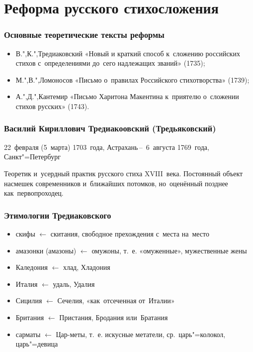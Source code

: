 \documentclass{beamer}
\begin{document}
\section{Реформа русского стихосложения}\label{sec:sys}


\begin{frame}
\frametitle{Основные теоретические тексты реформы}

\begin{itemize}
\item В.",К.",Тредиаковский «Новый и краткий способ к~сложению российских стихов с~определениями до~сего надлежащих званий» (1735);
\item М.",В.",Ломоносов  «Письмо о~правилах Российского стихотворства» (1739);
\item А.",Д.",Кантемир «Письмо Харитона Макентина к~приятелю о~сложении стихов русских» (1743).
\end{itemize}

\end{frame}


\begin{frame}
\frametitle{Василий Кириллович Тредиакоовский (Тредьяковский) }
\begin{flushleft}
22~февраля (5~марта) 1703~года, Астрахань\,--\,
6~августа 1769~года, Санкт"=Петербург
\end{flushleft}

\begin{flushleft}
Теоретик и~усердный практик русского стиха XVIII~века. Постоянный объект насмешек современников и~ближайших потомков, но~оценённый позднее как~первопроходец.
\end{flushleft}

\end{frame}

%

\begin{frame}
\frametitle{Этимологии Тредиаковского}

\begin{itemize}
\item скифы $ \leftarrow $ скитания, свободное прехождения с~места на~место
\item амазонки (амазоны) $ \leftarrow $ омужоны, т.~е. «омуженные», мужественные жены
\item Каледония $ \leftarrow $ хлад, Хладония
\item Италия $ \leftarrow $ удаль, Удалия
\item Сицилия $ \leftarrow $ Сечелия, «как~отсеченная от~Италии»
\item Британия $ \leftarrow $ Пристания, Бродания или~Братания
\item сарматы $ \leftarrow $ Цар-меты, т.~е. искусные метатели, ср.~царь"=колокол, царь"=девица
\end{itemize}

\end{frame}
\end{document}

